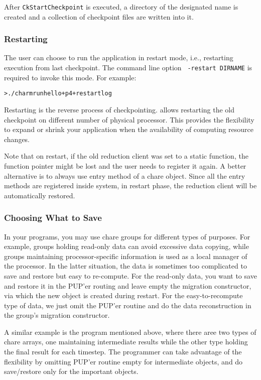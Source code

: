 After {\tt CkStartCheckpoint} is executed, a directory of the designated
name is created and a collection of checkpoint files are written into it. 

\subsubsection{Restarting}

The user can choose to run the \charmpp{} application in restart mode, i.e.,
restarting execution from last checkpoint. The command line option {\tt
-restart DIRNAME} is required to invoke this mode. For example:

\begin{alltt}
  > ./charmrun hello +p4 +restart log
\end{alltt}

Restarting is the reverse process of checkpointing. \charmpp{} allows 
restarting the old checkpoint on different number of physical processor.
This provides the flexibility to expand or shrink your application when
the availability of computing resource changes. 

Note that on restart, if the old reduction client was set to a static 
function, the function pointer might be lost and the user needs to register
it again. A better alternative is to always use entry method of a chare
object. Since all the entry methods are registered inside \charmpp{} system,
in restart phase, the reduction client will be automatically restored.

\subsubsection{Choosing What to Save}
In your programs, you may use chare groups for different types of purposes. 
For example, groups holding read-only data can avoid excessive data copying,
while groups maintaining processor-specific information is used as a local
manager of the processor. In the latter situation, the data is sometimes
too complicated to save and restore but easy to re-compute. For the read-only
data, you want to save and restore it in the PUP'er routing and leave empty
the migration constructor, via which the new object is created during restart.
For the easy-to-recompute type of data, we just omit the PUP'er routine and
do the data reconstruction in the group's migration constructor.

A similar example is the program mentioned above, where there aree two 
types of chare arrays, one maintaining intermediate results while the 
other type holding the final result for each timestep. The programmer 
can take advantage of the flexibility by omitting PUP'er routine empty
for intermediate objects, and do save/restore only for the important 
objects. 

